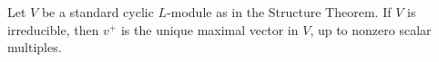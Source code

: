 Let $V$ be a standard cyclic $L$-module as in the Structure Theorem. If $V$ is irreducible, then $v^+$ is the unique maximal vector in $V$, up to nonzero scalar multiples.
